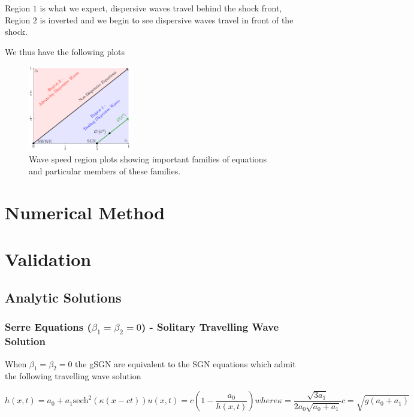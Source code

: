 \documentclass[10pt]{article}
\begin{document}
Region $1$ is what we expect, dispersive waves travel behind the shock front, Region $2$ is inverted and we begin to see dispersive waves travel in front of the shock. 


We thus have the following plots

\begin{figure}
		\centering
		\includegraphics[width=0.4\textwidth]{./Figures/Explanation/BetaPlotAll.pdf}
	\caption{Wave speed region plots showing important families of equations and particular members of these families.}
\end{figure}


\section{Numerical Method}


\section{Validation}

\subsection{Analytic Solutions}
\subsubsection{Serre Equations ($\beta_1=\beta_2 =0$) - Solitary Travelling Wave Solution}
When $\beta_1 = \beta_2 = 0$ the gSGN are equivalent to the SGN equations which admit the following travelling wave solution

\begin{subequations}
	\begin{equation}
	h(x,t) = a_0 + a_1 \text{sech}^2\left( \kappa (x - ct) \right)
	\end{equation}
	\begin{equation}
	u(x,t) = c \left( 1- \dfrac{a_0}{h(x,t)} \right)
	\end{equation}
	where
	\begin{equation}
	\kappa = \dfrac{\sqrt{3a_1}}{2a_0 \sqrt{a_0 + a_1}}
	\end{equation}
	\begin{equation}
	c = \sqrt{g\left(a_0 + a_1\right)}
	\end{equation}
\end{subequations}
\end{document}
